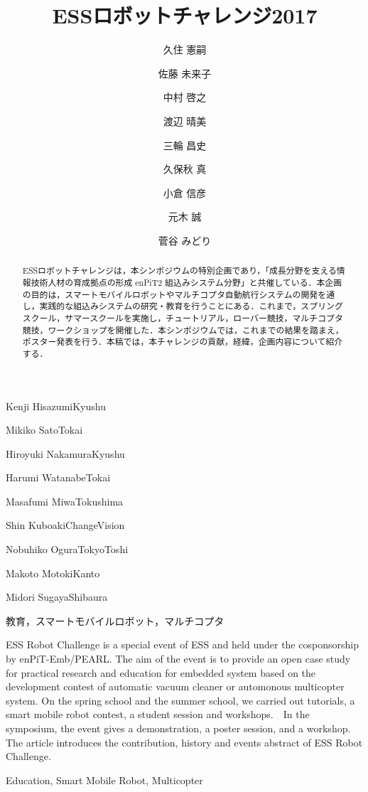 \documentclass[submit]{ipsj}
\begin{document}
\title{ESSロボットチャレンジ2017}



\author{久住 憲嗣}{Kenji Hisazumi}{Kyushu}
\author{佐藤 未来子}{Mikiko Sato}{Tokai}
\author{中村 啓之}{Hiroyuki Nakamura}{Kyushu}
\author{渡辺 晴美}{Harumi Watanabe}{Tokai}
\author{三輪 昌史}{Masafumi Miwa}{Tokushima}
\author{久保秋 真}{Shin Kuboaki}{ChangeVision}
\author{小倉 信彦}{Nobuhiko Ogura}{TokyoToshi}
\author{元木 誠}{Makoto Motoki}{Kanto}
\author{菅谷 みどり}{Midori Sugaya}{Shibaura}


\begin{abstract}
ESSロボットチャレンジは，本シンポジウムの特別企画であり，「成長分野を支える情報技術人材の育成拠点の形成
enPiT2 組込みシステム分野」と共催している．本企画の目的は，スマートモバイルロボットやマルチコプタ自動航行システムの開発を通し，実践的な組込みシステムの研究・教育を行うことにある．これまで，スプリングスクール，サマースクールを実施し，チュートリアル，ローバー競技，マルチコプタ競技，ワークショップを開催した．本シンポジウムでは，これまでの結果を踏まえ，ポスター発表を行う．本稿では，本チャレンジの貢献，経緯，企画内容について紹介する．
\end{abstract}

\begin{jkeyword}
教育，スマートモバイルロボット，マルチコプタ
\end{jkeyword}

\begin{eabstract}
ESS Robot Challenge is a special event of ESS and held under the cosponsorship by enPiT-Emb/PEARL. The aim of the event is to provide an open case study for practical research and education for embedded system based on the development contest of automatic vacuum cleaner or automonous multicopter system. On the spring school and the summer school, we carried out tutorials, a smart mobile robot contest, a student session and workshops.　In the symposium, the event gives a demonstration, a poster session, and a workshop. The article introduces the contribution, history and events abstract of ESS Robot Challenge.
\end{eabstract}

\begin{ekeyword}
Education, Smart Mobile Robot, Multicopter
\end{ekeyword}
\end{document}
